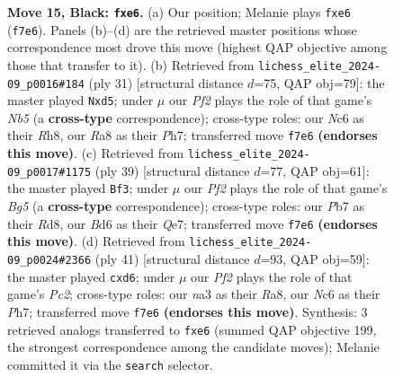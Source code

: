 \documentclass[11pt]{article}
\begin{document}
\begin{figure}[p]
\caption{\textbf{Move 15, Black: \texttt{fxe6}.} (a) Our position; Melanie plays \texttt{fxe6} (\texttt{f7e6}). Panels (b)--(d) are the retrieved master positions whose correspondence most drove this move (highest QAP objective among those that transfer to it). (b) Retrieved from \texttt{lichess\_elite\_2024-09\_p0016\#184} (ply 31) [structural distance $d$=75, QAP obj=79]: the master played \texttt{Nxd5}; under $\mu$ our \emph{Pf2} plays the role of that game's \emph{Nb5} (a \textbf{cross-type} correspondence); cross-type roles: our \emph{N}c6 as their \emph{R}h8, our \emph{R}a8 as their \emph{P}h7; transferred move \texttt{f7e6} \textbf{(endorses this move)}. (c) Retrieved from \texttt{lichess\_elite\_2024-09\_p0017\#1175} (ply 39) [structural distance $d$=77, QAP obj=61]: the master played \texttt{Bf3}; under $\mu$ our \emph{Pf2} plays the role of that game's \emph{Bg5} (a \textbf{cross-type} correspondence); cross-type roles: our \emph{P}b7 as their \emph{R}d8, our \emph{B}d6 as their \emph{Q}e7; transferred move \texttt{f7e6} \textbf{(endorses this move)}. (d) Retrieved from \texttt{lichess\_elite\_2024-09\_p0024\#2366} (ply 41) [structural distance $d$=93, QAP obj=59]: the master played \texttt{cxd6}; under $\mu$ our \emph{Pf2} plays the role of that game's \emph{Pc2}; cross-type roles: our \emph{n}a3 as their \emph{R}a8, our \emph{N}c6 as their \emph{P}h7; transferred move \texttt{f7e6} \textbf{(endorses this move)}. Synthesis: 3 retrieved analogs transferred to \texttt{fxe6} (summed QAP objective 199, the strongest correspondence among the candidate moves); Melanie committed it via the \texttt{search} selector.}
\label{fig:thought-m29}
\end{figure}

\clearpage
\end{document}
